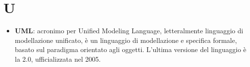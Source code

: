 \newpage
\section{U}

\begin{itemize}
	\item \textbf{UML}: acronimo per Unified Modeling Language, letteralmente linguaggio di modellazione unificato, è un linguaggio di modellazione e specifica formale, basato sul paradigma orientato agli oggetti. L'ultima versione del linguaggio è la 2.0, ufficializzata nel 2005.
\end{itemize}
